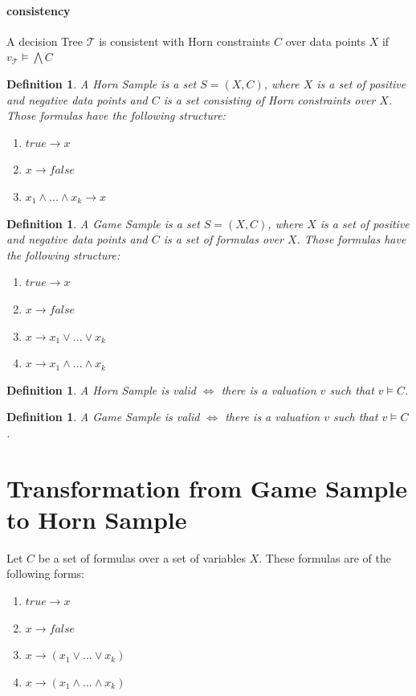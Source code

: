 \documentclass[10pt,a4paper]{article}
\theoremstyle{plain}
\newtheorem{mydef}[thm]{Definition}
\theoremstyle{definition}
\begin{document}
\paragraph*{consistency} A decision Tree $\mathcal{T}$ is consistent with Horn constraints $C$ over data points $X$ if 
$v_\mathcal{T} \vDash \bigwedge C$
\begin{mydef}
A \emph{Horn Sample} is a set $S = (X,C)$, where $X$ is a set of positive and negative data points and $C$ is a set consisting of Horn constraints over $X$. Those formulas have the following structure:
\begin{enumerate}
\item $true \to x$
\item $x \to false$
\item $x_1 \wedge...\wedge x_k \to x $
\end{enumerate}
\end{mydef}
\begin{mydef}
A \emph{Game Sample} is a set $S = (X,C)$, where $X$ is a set of positive and negative data points and $C$ is a set of formulas over $X$. Those formulas have the following structure:
\begin{enumerate}
\item $true \to x$
\item $x \to false$
\item $x \to x_1 \vee  ... \vee x_k$
\item $x \to x_1 \wedge ... \wedge x_k$ 
\end{enumerate}
\end{mydef}

\begin{mydef}
A Horn Sample is \emph{valid} $\iff $ there is a valuation $v$ such that $v \vDash C$.
\end{mydef}
\begin{mydef}
A Game Sample is \emph{valid} $\iff $ there is a valuation $v$ such that $v \vDash C$.
\end{mydef}

\section{Transformation from Game Sample to Horn Sample}
Let $C$ be a set of formulas over a set of variables $X$. These formulas are of the following forms:
\begin{enumerate}
\item $true \to x$
\item $x \to false$
\item $ x \to (x_1 \vee  ... \vee x_k)$
\item $ x\to (x_1 \wedge ... \wedge x_k)$
\end{enumerate}
\end{document}
